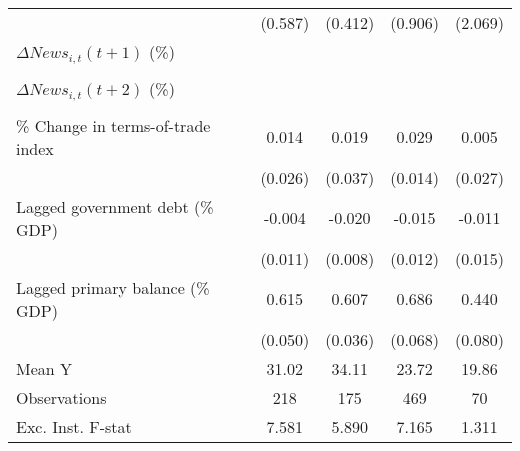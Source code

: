 {\begin{tabular}{l*{4}{c}}
                    &     (0.587)         &     (0.412)         &     (0.906)         &     (2.069)         \\
\addlinespace
$ \Delta News_{i,t}(t+1)$ (\%)&                     &                     &                     &                     \\
                    &                     &                     &                     &                     \\
\addlinespace
$ \Delta News_{i,t}(t+2)$ (\%)&                     &                     &                     &                     \\
                    &                     &                     &                     &                     \\
\addlinespace
\% Change in terms-of-trade index&       0.014         &       0.019         &       0.029\sym{**} &       0.005         \\
                    &     (0.026)         &     (0.037)         &     (0.014)         &     (0.027)         \\
\addlinespace
Lagged government debt (\% GDP)&      -0.004         &      -0.020\sym{**} &      -0.015         &      -0.011         \\
                    &     (0.011)         &     (0.008)         &     (0.012)         &     (0.015)         \\
\addlinespace
Lagged primary balance (\% GDP)&       0.615\sym{***}&       0.607\sym{***}&       0.686\sym{***}&       0.440\sym{***}\\
                    &     (0.050)         &     (0.036)         &     (0.068)         &     (0.080)         \\
\midrule
Mean Y              &       31.02         &       34.11         &       23.72         &       19.86         \\
Observations        &         218         &         175         &         469         &          70         \\
Exc. Inst. F-stat   &       7.581         &       5.890         &       7.165         &       1.311         \\
\bottomrule
\end{tabular}
}
